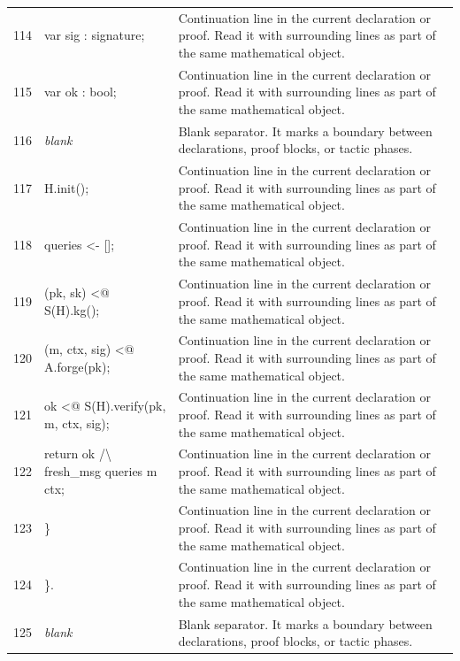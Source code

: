 \documentclass[10pt]{article}
\begin{document}
\begin{longtable}{r L{0.53\textwidth} L{0.37\textwidth}}
114 & {\ttfamily\scriptsize     var sig : signature;} & Continuation line in the current declaration or proof.  Read it with surrounding lines as part of the same mathematical object. \\
115 & {\ttfamily\scriptsize     var ok : bool;} & Continuation line in the current declaration or proof.  Read it with surrounding lines as part of the same mathematical object. \\
116 & {\ttfamily\scriptsize \emph{blank}} & Blank separator.  It marks a boundary between declarations, proof blocks, or tactic phases. \\
117 & {\ttfamily\scriptsize     H.init();} & Continuation line in the current declaration or proof.  Read it with surrounding lines as part of the same mathematical object. \\
118 & {\ttfamily\scriptsize     queries <- [];} & Continuation line in the current declaration or proof.  Read it with surrounding lines as part of the same mathematical object. \\
119 & {\ttfamily\scriptsize     (pk, sk) <@ S(H).kg();} & Continuation line in the current declaration or proof.  Read it with surrounding lines as part of the same mathematical object. \\
120 & {\ttfamily\scriptsize     (m, ctx, sig) <@ A.forge(pk);} & Continuation line in the current declaration or proof.  Read it with surrounding lines as part of the same mathematical object. \\
121 & {\ttfamily\scriptsize     ok <@ S(H).verify(pk, m, ctx, sig);} & Continuation line in the current declaration or proof.  Read it with surrounding lines as part of the same mathematical object. \\
122 & {\ttfamily\scriptsize     return ok /\textbackslash{} fresh\_msg queries m ctx;} & Continuation line in the current declaration or proof.  Read it with surrounding lines as part of the same mathematical object. \\
123 & {\ttfamily\scriptsize   \}} & Continuation line in the current declaration or proof.  Read it with surrounding lines as part of the same mathematical object. \\
124 & {\ttfamily\scriptsize \}.} & Continuation line in the current declaration or proof.  Read it with surrounding lines as part of the same mathematical object. \\
125 & {\ttfamily\scriptsize \emph{blank}} & Blank separator.  It marks a boundary between declarations, proof blocks, or tactic phases. \\

\end{longtable}
\end{document}
